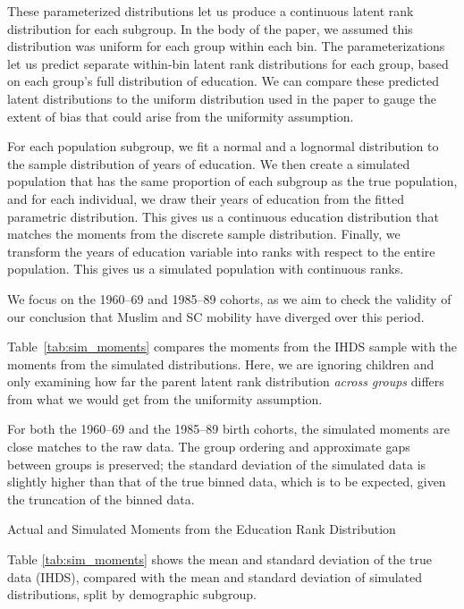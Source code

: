 These parameterized distributions let us produce a continuous latent rank distribution for each subgroup. In the body of the paper, we assumed this distribution was uniform for each group within each bin. The parameterizations let us predict separate within-bin latent rank distributions for each group, based on each group's full distribution of education. We can compare these predicted latent distributions to the uniform distribution used in the paper to gauge the extent of bias that could arise from the uniformity assumption.

For each population subgroup, we fit a normal and a lognormal distribution to the sample distribution of years of education. We then create a simulated population that has the same proportion of each subgroup as the true population, and for each individual, we draw their years of education from the fitted parametric distribution. This gives us a continuous education distribution that matches the moments from the discrete sample distribution.  Finally, we transform the years of education variable into ranks with respect to the entire population. This gives us a simulated population with continuous ranks.

We focus on the 1960--69 and 1985--89 cohorts, as we aim to check the validity of our conclusion that Muslim and SC mobility have diverged over this period.

Table~\ref{tab:sim_moments} compares the moments from the IHDS sample with the moments from the simulated distributions. Here, we are ignoring children and only examining how far the parent latent rank distribution \textit{across groups} differs from what we would get from the uniformity assumption.

For both the 1960--69 and the 1985--89 birth cohorts, the simulated moments are close matches to the raw data. The group ordering and approximate gaps between groups is preserved; the standard deviation of the simulated data is slightly higher than that of the true binned data, which is to be expected, given the truncation of the binned data.

\begin{table}
    \begin{center}
      \caption{Actual and Simulated Moments from the Education Rank Distribution}
      \label{tab:sim_moments}
      \small{
      }
    \end{center}
Table \ref{tab:sim_moments} shows the mean and standard deviation of the true data (IHDS), compared with the mean and standard deviation of simulated distributions, split by demographic subgroup.
  \end{table}  

